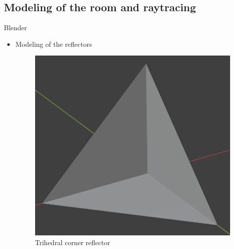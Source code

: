 \documentclass{beamer}
\newcounter{section}
\begin{document}
\subsection{Modeling of the room and raytracing}
\setcounter{section}{1}
\setcounter{figure}{0}
\begin{frame}[t]{Blender}

\begin{itemize}
	\item Modeling of the reflectors
    \vspace{1.0\baselineskip}
    \begin{figure}
        \centering
        \begin{minipage}{0.45\textwidth}
            \centering
            \includegraphics[height=0.5\textheight]{figures/tri_reflector.png}
            \caption{Trihedral corner reflector}
        \end{minipage}
        \begin{minipage}{0.45\textwidth}
            \centering

\end{minipage}
\end{figure}
\end{itemize}
\end{frame}
\end{document}
